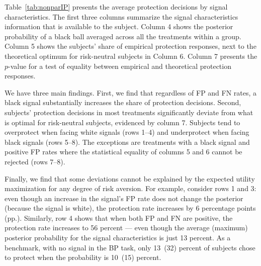\documentclass[12pt,a4paper]{article}
\newcommand{\pmt}[1]{{\color{Blue}#1}}
\begin{document}

Table~\ref{tab:nonparIP} presents the average protection decisions by signal characteristics. The first three columns summarize the signal characteristics information that is available to the subject. Column 4 shows the posterior probability of a black ball averaged across all the treatments within a group. Column 5 shows the subjects' share of empirical protection responses, next to the theoretical optimum for risk-neutral subjects in Column 6. Column 7 presents the $p$-value for a test of equality between empirical and theoretical protection responses.

We have three main findings. First, we find that regardless of FP and FN rates, a black signal substantially increases the share of protection decisions.  Second, subjects' protection decisions in most treatments significantly deviate from what is optimal for risk-neutral subjects, evidenced by column 7. Subjects tend to overprotect when facing white signals (rows 1--4) and underprotect when facing black signals (rows 5--8). The exceptions are treatments with a black signal and positive FP rates where the statistical equality of columns 5 and 6 cannot be rejected (rows 7--8).

Finally, we find that some deviations cannot be explained by the expected utility maximization for any degree of risk aversion. For example, consider rows 1 and 3: even though an increase in the signal's FP rate does not change the posterior (because the signal is white), the protection rate increases by 6 percentage points (pp.). Similarly, row 4 shows that when both FP and FN are positive, the protection rate increases to 56 percent --- even though the average (maximum) posterior probability for the signal characteristics is just 13 percent. As a benchmark, with no signal in the BP task, only 13~(32) percent of subjects chose to protect when the probability is 10~(15) percent. 

\end{document}
